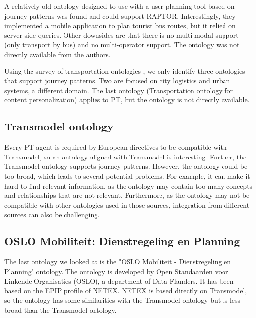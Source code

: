 A relatively old ontology designed to use with a user planning tool based on journey patterns \cite{5507372} was found and could support RAPTOR. Interestingly, they implemented a mobile application to plan tourist bus routes, but it relied on server-side queries. Other downsides are that there is no multi-modal support (only transport by bus) and no multi-operator support. The ontology was not directly available from the authors.

Using the survey of transportation ontologies \cite{katsumi_ontologies_2018}, we only identify three ontologies that support journey patterns. Two are focused on city logistics and urban systems, a different domain. The last ontology (Transportation ontology for content personalization) applies to PT, but the ontology is not directly available.

\subsection{Transmodel ontology}
Every PT agent is required by European directives to be compatible with Transmodel, so an ontology aligned with Transmodel is interesting. Further, the Transmodel ontology supports journey patterns. However, the ontology could be too broad, which leads to several potential problems. For example, it can make it hard to find relevant information, as the ontology may contain too many concepts and relationships that are not relevant. Furthermore, as the ontology may not be compatible with other ontologies used in those sources, integration from different sources can also be challenging.

\subsection{OSLO Mobiliteit: Dienstregeling en Planning}
The last ontology we looked at is the "OSLO Mobiliteit - Dienstregeling en Planning" \cite{noauthor_oslo_2023} ontology. The ontology is developed by Open Standaarden voor Linkende Organisaties (OSLO), a department of Data Flanders. It has been based on the EPIP profile of NETEX. NETEX is based directly on Transmodel, so the ontology has some similarities with the Transmodel ontology but is less broad than the Transmodel ontology.

